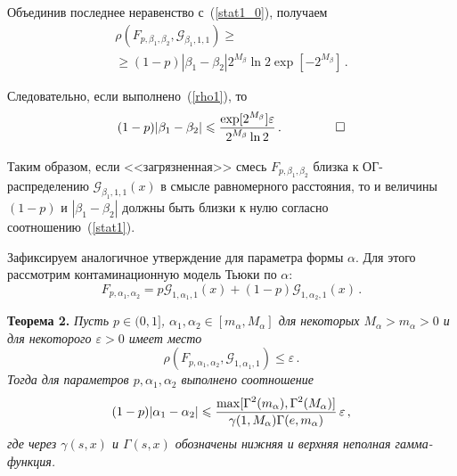 \begin{multicols}{2}
Объединив последнее неравенство с~(\ref{stat1_0}), получаем
\begin{multline*}
\rho(F_{p,\beta_1,\beta_2}, {\mathcal G}_{\beta_1,1,1} ) \geqslant{}\\
{}\geqslant
(1-p) |\beta_1-\beta_2| 2^{M_{\beta}} \ln2 \exp[-2^{M_{\beta}}]\,.
\end{multline*}

Следовательно, если выполнено~(\ref{rho1}), то
$$
(1-p) |\beta_1-\beta_2| \leqslant
\displaystyle\frac{\displaystyle \exp[2^{M_{\beta}}]\varepsilon\mathstrut}{\displaystyle 2^{M_{\beta}} \ln2\mathstrut}\,.~~~~~~~~~~~~~\square
$$


Таким образом, если <<загрязненная>> смесь $F_{p,\beta_1,\beta_2}$
близка к ОГ-рас\-пре\-де\-ле\-нию ${\mathcal G}_{\beta_1,1,1}(x)$ в смысле
равномерного расстояния, то и величины $(1-p)$ и
$|\beta_1-\beta_2|$ должны быть близки к нулю согласно
соотношению~(\ref{stat1}).


Зафиксируем аналогичное утверждение для параметра формы $\alpha$.
Для этого рассмотрим контаминационную модель Тьюки по $\alpha$:
\begin{equation*}
F_{p,\alpha_1,\alpha_2} = p {\mathcal G}_{1,\alpha_1,1}(x) +
(1-p){\mathcal G}_{1,\alpha_2,1}(x)\,. 
\end{equation*}

\smallskip

\noindent
\textbf{Теорема 2.} \textit{Пусть $p\in(0,1]$, $\alpha_1,\alpha_2 \in [m_{\alpha},
M_{\alpha}]$ для некоторых $M_{\alpha}>m_{\alpha}>0$ и для
некоторого $\varepsilon>0$ имеет место}
\begin{equation}
\rho(F_{p,\alpha_1,\alpha_2}, {\mathcal G}_{1,\alpha_1,1} )
\leqslant \varepsilon\,. \label{rho2}
\end{equation}
\textit{Тогда для параметров $p,\alpha_1,\alpha_2$ выполнено соотношение}
\begin{equation*}
(1-p) |\alpha_1-\alpha_2| \leqslant \fr{ \max
[\Gamma^2(m_{\alpha}),\Gamma^2(M_{\alpha})]}{\gamma(1,M_{\alpha})\Gamma(e,m_{\alpha})}
\, \varepsilon\,, %
\end{equation*}
\textit{где через $\gamma(s,x)$ и $\Gamma(s,x)$ обозначены нижняя и
верхняя неполная гамма-функция.}

\smallskip


\end{multicols}
